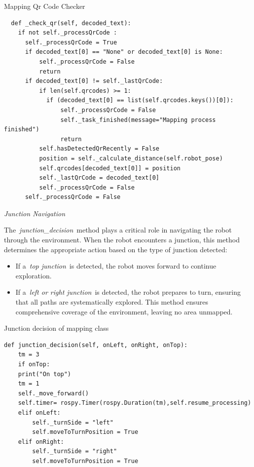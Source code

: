 \documentclass[../../main]{subfiles}
\begin{document}
\begin{codebox}[]{Mapping Qr Code Checker}
  \begin{verbatim}
  def _check_qr(self, decoded_text):
    if not self._processQrCode :
      self._processQrCode = True
      if decoded_text[0] == "None" or decoded_text[0] is None:
          self._processQrCode = False
          return 
      if decoded_text[0] != self._lastQrCode:
          if len(self.qrcodes) >= 1:
            if (decoded_text[0] == list(self.qrcodes.keys())[0]):
                self._processQrCode = False
                self._task_finished(message="Mapping process finished")
                return     
          self.hasDetectedQrRecently = False
          position = self._calculate_distance(self.robot_pose)
          self.qrcodes[decoded_text[0]] = position
          self._lastQrCode = decoded_text[0]
          self._processQrCode = False
      self._processQrCode = False

\end{verbatim}
\end{codebox}

\emph{Junction Navigation}

The~\emph{junction\_decision}~method plays a critical role in navigating
the robot through the environment. When the robot encounters a junction,
this method determines the appropriate action based on the type of
junction detected:

\begin{itemize}
\item
  If a~\emph{top junction}~is detected, the robot moves forward to
  continue exploration.
\item
  If a~\emph{left or right junction}~is detected, the robot prepares to
  turn, ensuring that all paths are systematically explored. This method
  ensures comprehensive coverage of the environment, leaving no area
  unmapped.
\end{itemize}

\begin{codebox}[]{Junction decision of mapping class}
  \begin{verbatim}
def junction_decision(self, onLeft, onRight, onTop):
    tm = 3
    if onTop:
    print("On top")
    tm = 1
    self._move_forward()
    self.timer= rospy.Timer(rospy.Duration(tm),self.resume_processing)
    elif onLeft:
        self._turnSide = "left"
        self.moveToTurnPosition = True
    elif onRight:
        self._turnSide = "right"
        self.moveToTurnPosition = True

\end{verbatim}
\end{codebox}
\end{document}
